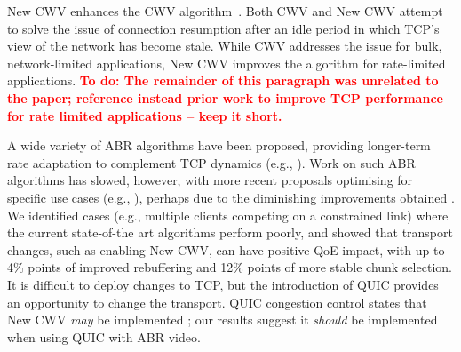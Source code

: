 \documentclass[10pt,sigconf]{acmart}
\newcommand{\todo}[1]{\textbf{\textcolor{red}{To do: #1}}}
\begin{document}
New CWV enhances the CWV algorithm~\cite{rfc2861-2000-padhye-congestion-window-validation}.
Both CWV and New CWV attempt to solve the issue of connection resumption after
an idle period in which TCP's view of the network has become stale. While CWV
addresses the issue for bulk, network-limited applications, New CWV improves
the algorithm for rate-limited applications.
\todo{The remainder of this paragraph was unrelated to the paper; reference
instead prior work to improve TCP performance for rate limited applications --
keep it short.}

A wide variety of ABR algorithms have been proposed, providing longer-term rate
adaptation to complement TCP dynamics (e.g., \cite{Sun-2016-cs2p,Jiang-2012-improving-fairness-http-video-festive,Spiteri-2016-BOLA,Huang-2015-A-buffer-based-approach-to-rate-adaptation-bba,Spiteri-2019-from-theory-to-practice-sabre,Wang-2016-squad}).
Work on such ABR algorithms has slowed, however, with more recent proposals optimising for specific use cases (e.g., \cite{Karagkioules-2020-achieving-low-latency}), perhaps due to the diminishing improvements obtained \cite{Yin-2015-a-control-theoritic-approach}. We identified cases (e.g., multiple clients competing on a constrained link) where the current state-of-the art algorithms perform poorly, and showed that transport changes, such as enabling New CWV, can have positive QoE impact, with up to 4\% points of improved rebuffering and 12\% points of more stable chunk selection. 
It is difficult to deploy changes to TCP, but the introduction of QUIC \cite{RFC9000}
provides an opportunity to change the transport. QUIC congestion control states that 
New CWV \emph{may} be implemented \cite{RFC9002}; our results suggest it \emph{should}
be implemented when using QUIC with ABR video.
\end{document}
